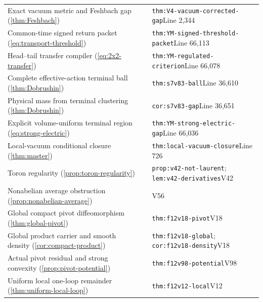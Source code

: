 \documentclass[11pt,oneside,openany]{book}
\theoremstyle{definition}
\theoremstyle{remark}
\begin{document}
\begin{longtable}{L{0.32\textwidth}L{0.12\textwidth}L{0.477\textwidth}}
Exact vacuum metric and Feshbach gap (\cref{thm:Feshbach}) & \cite{F1} & \nolinkurl{thm:V4-vacuum-corrected-gap}\newline Line 2,344 \\
Common-time signed return packet (\cref{eq:transport-threshold}) & \cite{GT} & \nolinkurl{thm:YM-signed-threshold-packet}\newline Line 66,113 \\
Head--tail transfer compiler (\cref{eq:2x2-transfer}) & \cite{GT} & \nolinkurl{thm:YM-regulated-criterion}\newline Line 66,078 \\
Complete effective-action terminal ball (\cref{thm:Dobrushin}) & \cite{F7} & \nolinkurl{thm:s7v83-ball}\newline Line 36,610 \\
Physical mass from terminal clustering (\cref{thm:Dobrushin}) & \cite{F7} & \nolinkurl{cor:s7v83-gap}\newline Line 36,651 \\
Explicit volume-uniform terminal region (\cref{eq:strong-electric}) & \cite{GT} & \nolinkurl{thm:YM-strong-electric-gap}\newline Line 66,036 \\
Local-vacuum conditional closure (\cref{thm:master}) & \cite{F1} & \nolinkurl{thm:local-vacuum-closure}\newline Line 726 \\
Toron regularity (\cref{prop:toron-regularity}) & \cite{F11} & \nolinkurl{prop:v42-not-laurent}; \nolinkurl{lem:v42-derivatives}\newline V42 \\
Nonabelian average obstruction (\cref{prop:nonabelian-average}) & \cite{F11} & V56 \\
Global compact pivot diffeomorphism (\cref{thm:global-pivot}) & \cite{F12} & \nolinkurl{thm:f12v18-pivot}\newline V18 \\
Global product carrier and smooth density (\cref{cor:compact-product}) & \cite{F12} & \nolinkurl{thm:f12v18-global}; \nolinkurl{cor:f12v18-density}\newline V18 \\
Actual pivot residual and strong convexity (\cref{prop:pivot-potential}) & \cite{F12} & \nolinkurl{thm:f12v98-potential}\newline V98 \\
Uniform local one-loop remainder (\cref{thm:uniform-local-loop}) & \cite{F12} & \nolinkurl{thm:f12v12-local}\newline V12 \\

\end{longtable}
\end{document}
